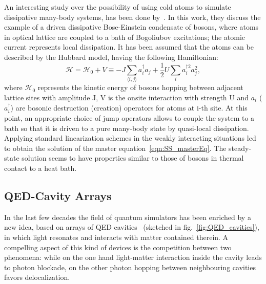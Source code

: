 An interesting study over the possibility of using cold atoms to simulate dissipative many-body systems, has been done by~\cite{BEC_dissipativeMBsimulator}. In this work, they discuss the example of a driven dissipative Bose-Einstein condensate of bosons, where atoms in optical lattice are coupled to a bath of Bogoliubov excitations; the atomic current represents local dissipation. It has been assumed that the atoms can be described by the Hubbard model, having the following Hamiltonian:
\begin{equation}
    \mathcal{H} = \mathcal{H}_0 + V \equiv -J \sum_{\langle i,j \rangle} a_i^{\dagger} a_j + \frac{1}{2}U \sum_i a_i^{\dagger 2} a_j^2,
\end{equation}
where $\mathcal{H}_0$ represents the kinetic energy of bosons hopping between
adjacent lattice sites with amplitude J, V is the onsite interaction
with strength U and $a_i$ ($a_i^{\dagger}$) are bosonic destruction (creation)
operators for atoms at i-th site. At this point, an appropriate choice of jump operators allows to couple the system to a bath so that it is driven to a pure many-body state by quasi-local dissipation. Applying standard linearization schemes in the weakly interacting situations led to obtain the solution of the master equation~\ref{eqn:SS_masterEq}. The steady-state solution seems to have properties similar to those of bosons in thermal contact to a heat bath.

\subsection{QED-Cavity Arrays}
In the last few decades the field of quantum simulators has been enriched by a new idea, based on arrays of QED cavities~\cite{Tomadin_Fazio} (sketched in fig.~\ref{fig:QED_cavities}), in which light resonates and interacts with matter contained therein.  A compelling aspect of this kind of devices is the competition between two phenomena: while on the one hand light-matter interaction inside the cavity leads to photon blockade, on the other photon hopping between neighbouring cavities favors delocalization.

